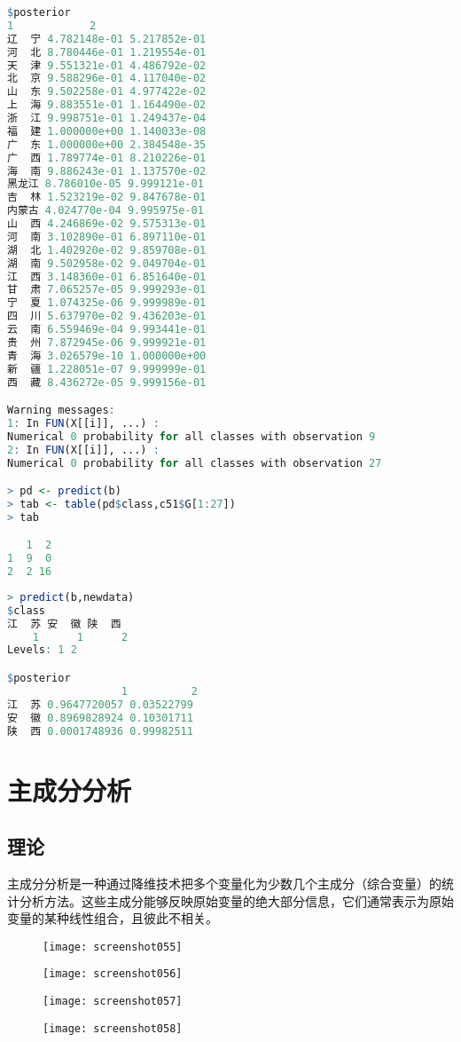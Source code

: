 \documentclass[11pt,a4paper,oneside]{book}
\begin{document}
\begin{lstlisting}[language=r]
$posterior
1            2
辽  宁 4.782148e-01 5.217852e-01
河  北 8.780446e-01 1.219554e-01
天  津 9.551321e-01 4.486792e-02
北  京 9.588296e-01 4.117040e-02
山  东 9.502258e-01 4.977422e-02
上  海 9.883551e-01 1.164490e-02
浙  江 9.998751e-01 1.249437e-04
福  建 1.000000e+00 1.140033e-08
广  东 1.000000e+00 2.384548e-35
广  西 1.789774e-01 8.210226e-01
海  南 9.886243e-01 1.137570e-02
黑龙江 8.786010e-05 9.999121e-01
吉  林 1.523219e-02 9.847678e-01
内蒙古 4.024770e-04 9.995975e-01
山  西 4.246869e-02 9.575313e-01
河  南 3.102890e-01 6.897110e-01
湖  北 1.402920e-02 9.859708e-01
湖  南 9.502958e-02 9.049704e-01
江  西 3.148360e-01 6.851640e-01
甘  肃 7.065257e-05 9.999293e-01
宁  夏 1.074325e-06 9.999989e-01
四  川 5.637970e-02 9.436203e-01
云  南 6.559469e-04 9.993441e-01
贵  州 7.872945e-06 9.999921e-01
青  海 3.026579e-10 1.000000e+00
新  疆 1.228051e-07 9.999999e-01
西  藏 8.436272e-05 9.999156e-01

Warning messages:
1: In FUN(X[[i]], ...) :
Numerical 0 probability for all classes with observation 9
2: In FUN(X[[i]], ...) :
Numerical 0 probability for all classes with observation 27

> pd <- predict(b)
> tab <- table(pd$class,c51$G[1:27])
> tab

   1  2
1  9  0
2  2 16
\end{lstlisting}
\begin{lstlisting}[language=r]
> predict(b,newdata)
$class
江  苏 安  徽 陕  西 
    1      1      2 
Levels: 1 2

$posterior
                  1          2
江  苏 0.9647720057 0.03522799
安  徽 0.8969828924 0.10301711
陕  西 0.0001748936 0.99982511
\end{lstlisting}

\chapter{主成分分析}
\section{理论}
主成分分析是一种通过降维技术把多个变量化为少数几个主成分（综合变量）的统计分析方法。这些主成分能够反映原始变量的绝大部分信息，它们通常表示为原始变量的某种线性组合，且彼此不相关。

\begin{figure}[H]
	\centering
	\texttt{[image: screenshot055]}
\end{figure}
\begin{figure}[H]
	\centering
	\texttt{[image: screenshot056]}
\end{figure}
\begin{figure}[H]
	\centering
	\texttt{[image: screenshot057]}
\end{figure}
\begin{figure}[H]
	\centering
	\texttt{[image: screenshot058]}
\end{figure}
\end{document}

